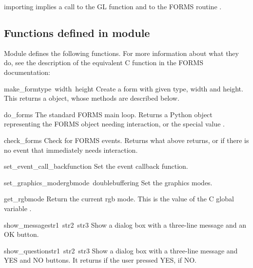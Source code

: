  importing  implies a call to the GL function
 and to the FORMS routine .

\subsection{Functions defined in module }

Module  defines the following functions.  For more information
about what they do, see the description of the equivalent C function
in the FORMS documentation:

\renewcommand{\indexsubitem}{(in module fl)}
\begin{funcdesc}{make_form}{type\, width\, height}
Create a form with given type, width and height.  This returns a
 object, whose methods are described below.
\end{funcdesc}

\begin{funcdesc}{do_forms}{}
The standard FORMS main loop.  Returns a Python object representing
the FORMS object needing interaction, or the special value
.
\end{funcdesc}

\begin{funcdesc}{check_forms}{}
Check for FORMS events.  Returns what  above returns,
or  if there is no event that immediately needs
interaction.
\end{funcdesc}

\begin{funcdesc}{set_event_call_back}{function}
Set the event callback function.
\end{funcdesc}

\begin{funcdesc}{set_graphics_mode}{rgbmode\, doublebuffering}
Set the graphics modes.
\end{funcdesc}

\begin{funcdesc}{get_rgbmode}{}
Return the current rgb mode.  This is the value of the C global
variable .
\end{funcdesc}

\begin{funcdesc}{show_message}{str1\, str2\, str3}
Show a dialog box with a three-line message and an OK button.
\end{funcdesc}

\begin{funcdesc}{show_question}{str1\, str2\, str3}
Show a dialog box with a three-line message and YES and NO buttons.
It returns  if the user pressed YES,  if NO.
\end{funcdesc}

